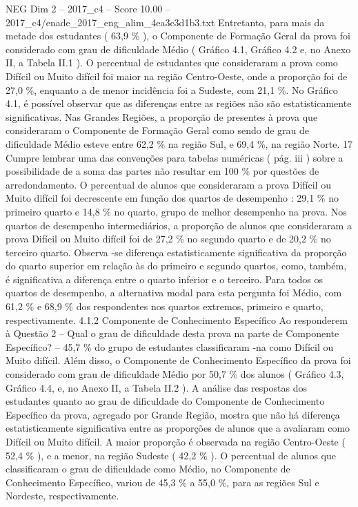 \begin{textsample}{NEG Dim 2 – 2017\_c4 – Score 10.00 – 2017\_c4/enade\_2017\_eng\_alim\_4ea3c3d1b3.txt}
Entretanto, para mais da metade dos estudantes ( 63,9 \% ), o Componente de Formação Geral da prova foi considerado com grau de dificuldade Médio ( Gráfico 4.1, Gráfico 4.2 e, no Anexo II, a Tabela II.1 ).
O percentual de estudantes que consideraram a prova como Difícil ou Muito difícil foi maior na região Centro-Oeste, onde a proporção foi de 27,0 \%, enquanto a de menor incidência foi a Sudeste, com 21,1 \%.
No Gráfico 4.1, é possível observar que as diferenças entre as regiões não são estatisticamente significativas.
Nas Grandes Regiões, a proporção de presentes à prova que consideraram o Componente de Formação Geral como sendo de grau de dificuldade Médio esteve entre 62,2 \% na região Sul, e 69,4 \%, na região Norte. 17 Cumpre lembrar uma das convenções para tabelas numéricas ( pág. iii ) sobre a possibilidade de a soma das partes não resultar em 100 \% por questões de arredondamento.
O percentual de alunos que consideraram a prova Difícil ou Muito difícil foi decrescente em função dos quartos de desempenho : 29,1 \% no primeiro quarto e 14,8 \% no quarto, grupo de melhor desempenho na prova.
Nos quartos de desempenho intermediários, a proporção de alunos que consideraram a prova Difícil ou Muito difícil foi de 27,2 \% no segundo quarto e de 20,2 \% no terceiro quarto.
Observa -se diferença estatisticamente significativa da proporção do quarto superior em relação às do primeiro e segundo quartos, como, também, é significativa a diferença entre o quarto inferior e o terceiro.
Para todos os quartos de desempenho, a alternativa modal para esta pergunta foi Médio, com 61,2 \% e 68,9 \% dos respondentes nos quartos extremos, primeiro e quarto, respectivamente. 4.1.2 Componente de Conhecimento Específico Ao responderem à Questão 2 – Qual o grau de dificuldade desta prova na parte de Componente Específico? – 45,7 \% do grupo de estudantes classificaram -na como Difícil ou Muito difícil.
Além disso, o Componente de Conhecimento Específico da prova foi considerado com grau de dificuldade Médio por 50,7 \% dos alunos ( Gráfico 4.3, Gráfico 4.4, e, no Anexo II, a Tabela II.2 ).
A análise das respostas dos estudantes quanto ao grau de dificuldade do Componente de Conhecimento Específico da prova, agregado por Grande Região, mostra que não há diferença estatisticamente significativa entre as proporções de alunos que a avaliaram como Difícil ou Muito difícil.
A maior proporção é observada na região Centro-Oeste ( 52,4 \% ), e a menor, na região Sudeste ( 42,2 \% ).
O percentual de alunos que classificaram o grau de dificuldade como Médio, no Componente de Conhecimento Específico, variou de 45,3 \% a 55,0 \%, para as regiões Sul e Nordeste, respectivamente.

\end{textsample}

